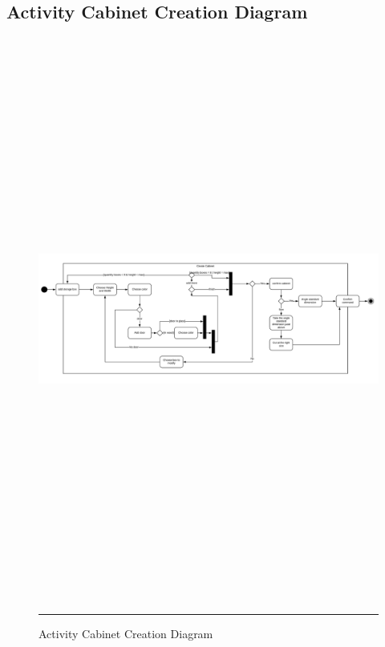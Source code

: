     \subsection{Activity Cabinet Creation Diagram}
        \vfill
        \begin{figure}[h!]
            \centering
			\includegraphics [angle = 90, height=185mm]{Figures/ActivityCabinetDiagram.png}
			\rule{35em}{0.5pt}
			\caption{Activity Cabinet Creation Diagram}
			\label{activitycabinetdiagram}
    	\end{figure}
        \vfill
        
    \newpage
